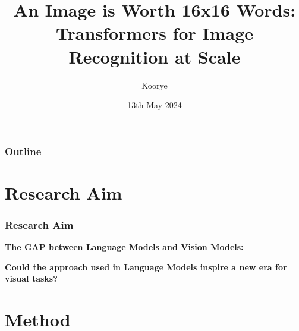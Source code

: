 \documentclass{beamer}
\title[An Image is Worth 16x16 Words]{An Image is Worth 16x16 Words: \\ Transformers for Image Recognition at Scale}
\author{Koorye}
\institute[UESTC]{University of Electronic and Science Technology of China}
\date{13th May 2024}
\begin{document}
\begin{frame}
\titlepage
\end{frame}

\begin{frame}
\frametitle{Outline}
\tableofcontents
\end{frame}

\section{Research Aim}

\begin{frame}
\frametitle{Research Aim}

\textbf{The GAP between Language Models and Vision Models:}

\begin{figure}
\centering
{}
\end{figure}

\textbf{Could the approach used in Language Models inspire a new era for visual tasks?}

\end{frame}

\section{Method}
\end{document}
